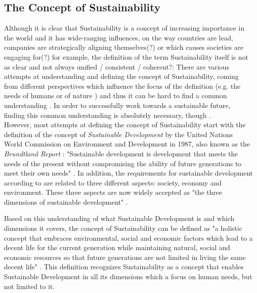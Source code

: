 \documentclass[oribibl]{llncs}
\begin{document}
\subsection{The Concept of Sustainability}
Although it is clear that Sustainability is a concept of increasing importance in the world and it has wide-ranging influences, on the way countries are lead, companies are strategically aligning themselves(?) or which causes societies are engaging for(?) for example, the definition of the term Sustainability itself is not as clear and not always unified / consistent / coherent?: %
There are various attempts at understanding and defining the concept of Sustainability, coming from different perspectives which influence the focus of the definition (e.g. the needs of humans or of nature \cite{gladwin_shifting_1995}) and thus it can be hard to find a common understanding \cite{jamieson_sustainability_1998}%
. In order to successfully work towards a sustainable future, finding this common understanding is absolutely necessary, though \cite{jamieson_sustainability_1998}.\\

However, most attempts at defining the concept of Sustainability start with the definition of the concept of \textit{Sustainable Development} by the United Nations World Commission on Environment and Development in 1987, also known as the \textit{Brundtland Report} %
: "Sustainable development is development that meets the needs of the present without compromising the ability of future generations to meet their own needs"\cite{Brundtland1987} %
. In addition, the requirements for sustainable development according to \cite{Brundtland1987} are related to three different aspects: society, economy and environment. These three aspects are now widely accepted as "the three dimensions of sustainable development" \cite{UN_transform_15}.

Based on this understanding of what Sustainable Development is and which dimensions it covers, the concept of Sustainability can be defined as "a holistic concept that embraces environmental, social and economic factors which lead to a decent life for the current generation while maintaining natural, social and economic resources so that future generations are not limited in living the same decent life" \cite{buchner_sust_16}.%
This definition recognizes Sustainability as a concept that enables Sustainable Development in all its dimensions which a focus on human needs, but not limited to it.
\end{document}
